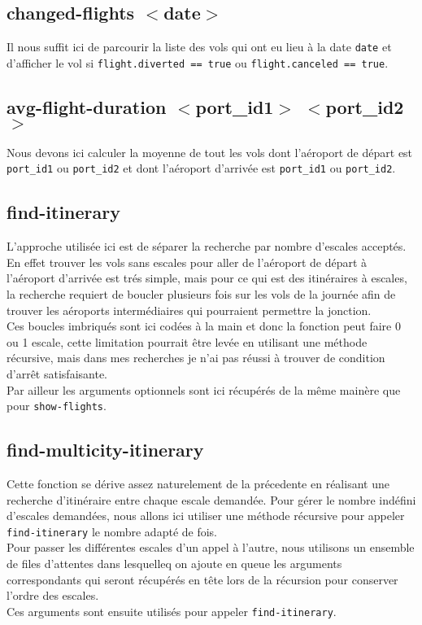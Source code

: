 \documentclass[a4paper, 9pt]{article}
\begin{document}
	\subsection{\texorpdfstring{changed-flights $<$date$>$}{}}
	Il nous suffit ici de parcourir la liste des vols qui ont eu lieu à la date \lstinline|date| et d'afficher le vol si \lstinline|flight.diverted == true| ou \lstinline|flight.canceled == true|.\\
	
	\subsection{\texorpdfstring{avg-flight-duration $<$port\_id1$>$ $<$port\_id2$>$}{}}
	Nous devons ici calculer la moyenne de tout les vols dont l'aéroport de départ est \lstinline|port_id1| ou \lstinline|port_id2| et dont l'aéroport d'arrivée est \lstinline|port_id1| ou \lstinline|port_id2|.
	
	\subsection{\texorpdfstring{find-itinerary}{PDFstring}}
	L'approche utilisée ici est de séparer la recherche par nombre d'escales acceptés. En effet trouver les vols sans escales pour aller de l'aéroport de départ à l'aéroport d'arrivée est trés simple, mais pour ce qui est des itinéraires à escales, la recherche requiert de boucler plusieurs fois sur les vols de la journée afin de trouver les aéroports intermédiaires qui pourraient permettre la jonction.\\
	Ces boucles imbriqués sont ici codées à la main et donc la fonction peut faire 0 ou 1 escale, cette limitation pourrait être levée en utilisant une méthode récursive, mais dans mes recherches je n'ai pas réussi à trouver de condition d'arrêt satisfaisante.\\
	Par ailleur les arguments optionnels sont ici récupérés de la même mainère que pour \lstinline|show-flights|.\\
	
	\subsection{find-multicity-itinerary}
	Cette fonction se dérive assez naturelement de la précedente en réalisant une recherche d'itinéraire entre chaque escale demandée. Pour gérer le nombre indéfini d'escales demandées, nous allons ici utiliser une méthode récursive pour appeler \lstinline|find-itinerary| le nombre adapté de fois.\\
	Pour passer les différentes escales d'un appel à l'autre, nous utilisons un ensemble de files d'attentes dans lesquelleq on ajoute en queue les arguments correspondants qui seront récupérés en tête lors de la récursion pour conserver l'ordre des escales.\\
	Ces arguments sont ensuite utilisés pour appeler \lstinline|find-itinerary|.\\
	
\end{document}
